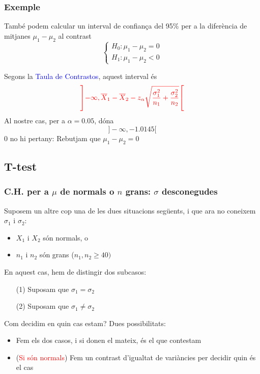 \documentclass[12pt,t]{beamer}\usepackage[]{graphicx}\usepackage[]{color}
\newcommand{\red}[1]{\textcolor{red}{#1}}
\newcommand{\blue}[1]{\textcolor{blue}{#1}}
\renewcommand{\emph}[1]{{\color{red}#1}}
\renewcommand{\geq}{\geqslant}
\theoremstyle{plain}
\theoremstyle{definition}
\begin{document}
\begin{frame}
\frametitle{Exemple}
També podem calcular un \emph{interval de confiança} del 95\% per a la
diferència de mitjanes $\mu_1-\mu_2$ al contrast
$$
\left\{\begin{array}{l}
H_0:\mu_1-\mu_2=0\\
H_1:\mu_1- \mu_2<0
\end{array}\right.
$$

Segons la \blue{Taula de Contrastos}, aquest interval és
{\small $$
\red{\left] -\infty, \overline{X}_1 -\overline{X}_2
-z_{\alpha}\sqrt{\frac{\sigma_1^2}{n_1}+\frac{\sigma_2^2}{n_2}}\right[}
$$}
Al nostre cas, per a $\alpha=0.05$, dóna
$$
]-\infty,-1.0145[
$$
0 no hi pertany: \emph{Rebutjam que $\mu_1-\mu_2=0$}

\end{frame}

\subsection{T-test}

\begin{frame}
\frametitle{C.H. per a $\mu$ de normals o $n$ grans: $\sigma$ desconegudes}
\vspace*{-2ex}

Suposem un altre cop una de les dues situacions següents, i que ara no coneixem  $\sigma_1$ i $\sigma_2$:
\begin{itemize}
\item $X_1$ i $X_2$ són normals, o

\item $n_1$ i $n_2$ són grans ($n_1,n_2\geq 40)$
\end{itemize}
\medskip

En aquest cas, hem de distingir dos subcasos:
\begin{enumerate}
\item[(1)] Suposam que $\sigma_1=\sigma_2$
\item[(2)] Suposam que $\sigma_1\neq \sigma_2$
\end{enumerate}
\medskip
\pause

Com decidim en quin cas estam? Dues possibilitats:
\begin{itemize}
\item Fem els dos casos, i si donen el mateix, és el que contestam
\item (\red{Si són normals}) Fem un contrast d'igualtat de variàncies per decidir quin és el cas
\end{itemize}



\end{frame}
\end{document}
